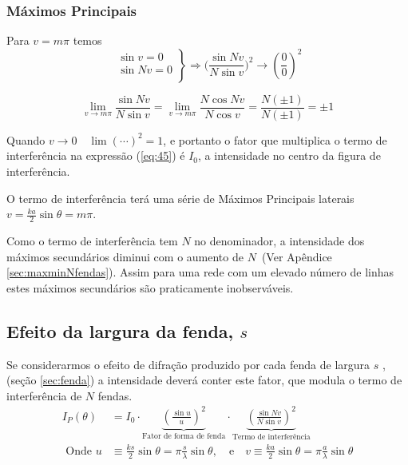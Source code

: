 \documentclass[a4paper,12pt]{article}
\begin{document}
\subsubsection{Máximos Principais}
Para $ v = m \pi$ temos 
\begin{equation*}
 \left.
	\begin{array}{rl} 
			\sin v =0 \\
			\sin Nv =0 \\			
	\end{array} \right\} 
  \Rightarrow \big( \frac{\sin N v }{N \sin v} \big)^2 \to \left( \frac{0 }{0} \right)^2 
\end{equation*}


\begin{equation}
	\label{eq:46} \lim_{v \rightarrow m \pi} \frac{\sin N v}{N \sin v} = \lim_{v \rightarrow m \pi} \frac{N \cos N v}{N \cos v} =\frac{N (\pm 1)}{N (\pm 1)} = \pm 1 
\end{equation}

Quando $v \rightarrow 0 \quad \lim (\cdots)^2  =  1$, %
e portanto o fator que multiplica o termo de interferência na expressão (\ref{eq:45}) é  $I_0$, a intensidade no centro da figura  de interferência.

O termo de interferência terá uma série de Máximos Principais laterais $ v = \frac{k a }{2} \sin \theta = m \pi$. 

Como o termo de interferência tem $N$ no denominador, a intensidade dos máximos secundários diminui com o aumento de $N\,$ (Ver Apêndice \ref{sec:maxminNfendas}). 
Assim para uma rede com um elevado número de linhas estes máximos secundários são praticamente inobserváveis.

\subsection{\sf Efeito da largura da fenda, $s$}

Se considerarmos o efeito de difração produzido por cada fenda de largura $s$ , (seção \ref{sec:fenda})  
a intensidade deverá conter este fator, que modula o termo de interferência de $N$ fendas.
\begin{align}
I_P(\theta) &= I_0 \cdot \underbrace{\left( \frac{\sin u}{u} \right)^2}_\text{Fator de forma de fenda}
	\cdot  \underbrace{ \left( \frac{\sin N v}{N \sin  v} \right)^2 }_\text{Termo de interferência} \nonumber \\
\text{ Onde } u &\equiv \frac{ k s}{2} \sin \theta =  \pi \frac{ s}{\lambda} \sin \theta , \quad \text{e} \quad
v \equiv  \frac{ k a}{2} \sin \theta =  \pi \frac{a}{\lambda} \sin \theta 
\end{align}
\end{document}
